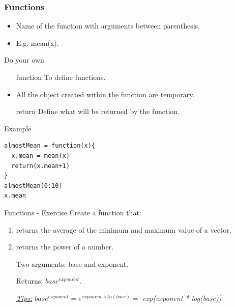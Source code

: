 \documentclass[10pt]{beamer}
\newenvironment{xframe}[2][]
  {\begin{frame}[fragile,environment=xframe,#1]
  \frametitle{#2}}
  {\end{frame}}
\begin{document}
\begin{xframe}{Functions}
  \begin{block}{}
    \begin{itemize}
    \item Name of the function with arguments between parenthesis.
    \item E.g. {\sf mean(x)}.
    \end{itemize}
  \end{block}
  \begin{block}{Do your own}
    \begin{itemize}
      \item[function] To define functions.
      \item All the object created within the function are temporary.
      \item[return] Define what will be returned by the function. 
    \end{itemize}
  \end{block}
  \begin{exampleblock}{Example}
\begin{verbatim}
almostMean = function(x){
  x.mean = mean(x)
  return(x.mean+1)
}
almostMean(0:10)
x.mean
\end{verbatim}
  \end{exampleblock}
\end{xframe}


\begin{frame}{Functions - Exercise}
  Create a function that: 
  \begin{enumerate}
  \item returns the average of the minimum and maximum value of a vector.
  \item returns the power of a number. 
    
    Two arguments: {\sf base} and {\sf exponent}. 
    
    Returns: $base^{exponent}$.
    \medskip
    
    {\tiny\it \uline{Tips:}   $base^{exponent} = e^{exponent \times ln(base)} = $ {\sf exp(exponent * log(base))} }
  \end{enumerate}
\end{frame}
\end{document}

